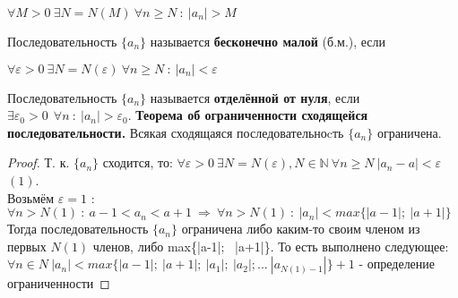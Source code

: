 \documentclass[12pt]{article}
\begin{document}
    \begin{center}
        $\forall M > 0 \ \exists N = N(M) \ \forall n \geq N \ : \ |a_n| > M$
    \end{center}
    Последовательность $\{a_n\}$ называется \textbf{бесконечно малой} (б.м.), если 
    \begin{center}
        $\forall \varepsilon > 0 \ \exists N = N(\varepsilon) \ \forall n \geq N \ : \ |a_n| < \varepsilon$
    \end{center}
    Последовательность $\{a_n\}$ называется \textbf{отделённой от нуля}, если $\exists  \varepsilon_0 > 0 \ \ \forall n \ : \ |a_n| > \varepsilon_0$.
    \textbf{Теорема об ограниченности сходящейся последовательности.} Всякая сходящаяся последовательноcть $\{a_n\}$ ограничена.
    \begin{proof}
        Т. к. $\{a_n\}$ сходится, то: $\forall \varepsilon  > 0 \ \exists N = N(\varepsilon), N \in \mathbb{N} \ \forall n \geq N \ |a_n - a| < \varepsilon$ \ \ $(1)$. \\
        Возьмём $\varepsilon = 1$ :  $\forall n > N(1) \ : \ a - 1 < a_n < a + 1 \ \Rightarrow \ \forall n > N(1) \ : \ |a_n| < max\{|a-1|; \ |a+1|\}$ \\
        Тогда последовательность $\{a_n\}$ ограничена либо каким-то своим членом из первых $N(1)$ членов, либо max\{|a-1|; \ |a+1|\}. То есть выполнено следующее: \\ $\forall n \in N \ |a_n| < max\{|a-1|; \ |a+1|; \ |a_1|; \ |a_2|; ... \ |a_{N(1) - 1}| \} + 1$ - определение ограниченности
    \end{proof}
\end{document}
